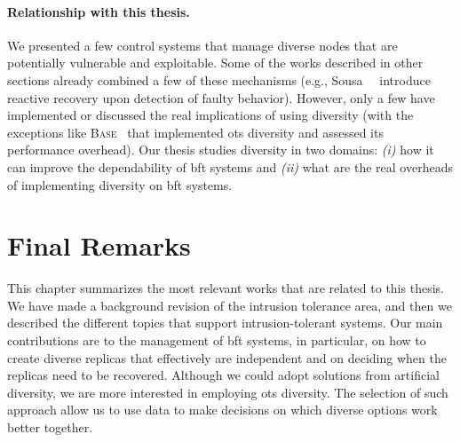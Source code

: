 \paragraph{Relationship with this thesis.}
We presented a few control systems that manage diverse nodes that are potentially vulnerable and exploitable.
Some of the works described in other sections already combined a few of these mechanisms (e.g., Sousa~\etal{}~\cite{Sousa:2010} introduce reactive recovery upon detection of faulty behavior). 
However, only a few have implemented or discussed the real implications of using diversity (with the exceptions like \textsc{Base}~\cite{Castro:2003} that implemented \gls{ots} diversity and assessed its performance overhead).
Our thesis studies diversity in two domains: \emph{(i)} how it can improve the dependability of \gls{bft} systems and \emph{(ii)} what are the real overheads of implementing diversity on \gls{bft} systems.



\section{Final Remarks}
This chapter summarizes the most relevant works that are related to this thesis.
We have made a background revision of the intrusion tolerance area, and then we described the different topics that support intrusion-tolerant systems.
Our main contributions are to the management of \gls{bft} systems, in particular, on how to create diverse replicas that effectively are independent and on deciding when the replicas need to be recovered. 
Although we could adopt solutions from artificial diversity, we are more interested in employing \gls{ots} diversity.
The selection of such approach allow us to use data to make decisions on which diverse options work better together.





